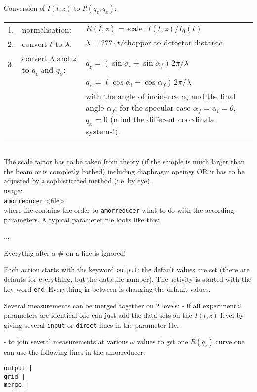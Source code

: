 \documentclass[10pt]{article}
\newcommand{\<}{$<$}
\renewcommand{\>}{\/$>$}
\begin{document}
Conversion of $I(t,z)$ to $R(q_z,q_x)$:  \\
\begin{tabular}{llp{120mm}}
1.&normalisation:
  &$R(t,z) = \mbox{scale} \cdot I(t,z)/I_0(t)$ \\
2.&convert $t$ to $\lambda$:
  &$\lambda = ??? \cdot t / \mbox{chopper-to-detector-distance}$ \\
3.&convert $\lambda$ and $z$ to $q_z$ and $q_x$: 
  &$q_z = (\sin \alpha_i + \sin \alpha_f)\,2\pi/\lambda $ \\ &
  &$q_x = (\cos \alpha_i - \cos \alpha_f)\,2\pi/\lambda$ \\ 
  &&{with the angle of incidence $\alpha_i$ and
   the final angle $\alpha_f$;
   for the specular case $\alpha_f=\alpha_i=\theta$, $q_x=0$ 
   (mind the different coordinate systems!).} 
\end{tabular} \\

The scale factor has to be taken from theory (if the sample is much
larger than the beam or is completly bathed) including diaphragm opeings
OR it has to be adjusted by a sophisticated method (i.e. by eye). \\

usage: \\
\texttt{amorreducer} <file> \\
where file contains the order to \texttt{amorreducer} what to do
with the according parameters. A typical parameter file looks like
this:

...

Everythig after a \# on a line is ignored!

Each action starts with the keyword \texttt{output}: the default
values are set (there are defauts for everything, but the data file
number). The activity is started with the key word \texttt{end}.
Everything in between is changing the default values. 


Several measurements can be merged together on 2 levels: 
- if all experimental parameters are identical one can just add
the data sets on the $I(t,z)$ level by giving several 
\texttt{input} or \texttt{direct} lines in the parameter file.

- to join several measurements at various $\omega$ values to get
one $R(q_z)$ curve one can use the following lines in the
amorreducer:

\texttt{output  | } \\
\texttt{grid    | } \\
\texttt{merge   | } 
\end{document}
